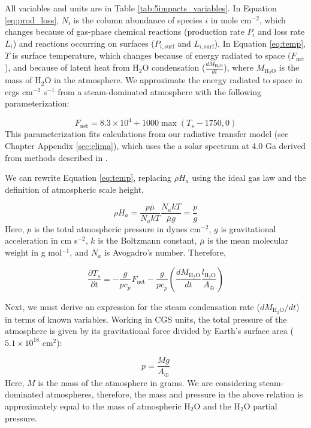 All variables and units are in Table \ref{tab:5impacts_variables}. In Equation \eqref{eq:prod_loss}, $N_i$ is the column abundance of species $i$ in mole cm$^{-2}$, which changes because of gas-phase chemical reactions (production rate $P_i$ and loss rate $L_i$) and reactions occurring on surfaces ($P_{i,\text{surf}}$ and $L_{i,\text{surf}}$). In Equation \eqref{eq:temp}, $T$ is surface temperature, which changes because of energy radiated to space ($F_\text{net}$), and because of latent heat from H$_2$O condensation ($\frac{d M_\mathrm{H_2O}}{dt}$), where $M_\mathrm{H_2O}$ is the mass of H$_2$O in the atmosphere. We approximate the energy radiated to space in ergs cm$^{-2}$ s$^{-1}$ from a steam-dominated atmosphere with the following parameterization:

\begin{equation}
  F_\text{net} = 8.3 \times 10^4 + 1000 \max(T_s - 1750,0)
\end{equation}
This parameterization fits calculations from our radiative transfer model (see Chapter Appendix \ref{sec:clima}), which uses the a solar spectrum at 4.0 Ga derived from methods described in \citet{Claire_2012}. 

We can rewrite Equation \eqref{eq:temp}, replacing $\rho H_a$ using the ideal gas law and the definition of atmospheric scale height,

\begin{equation}
  \rho H_a = \frac{p \bar\mu}{N_a k T} \frac{N_a k T}{\bar\mu g} = \frac{p}{g}
\end{equation}
Here, $p$ is the total atmospheric pressure in dynes cm$^{-2}$, $g$ is gravitational acceleration in cm s$^{-2}$, $k$ is the Boltzmann constant, $\bar\mu$ is the mean molecular weight in g mol$^{-1}$, and $N_a$ is Avogadro's number. Therefore,

\begin{equation} \label{eq:temp0}
  \frac{\partial T_s}{\partial t} = -\frac{g}{p c_p} F_\text{net} - \frac{g}{p c_p}\left(\frac{d M_\mathrm{H_2O}}{dt} \frac{l_\mathrm{H_2O}}{A_\oplus}\right) 
\end{equation}

Next, we must derive an expression for the steam condensation rate ($d M_\mathrm{H_2O}/dt$) in terms of known variables. Working in CGS units, the total pressure of the atmosphere is given by its gravitational force divided by Earth's surface area ($5.1 \times 10^{18}$ cm$^2$):

\begin{equation}
 p = \frac{Mg}{A_\oplus}
\end{equation}
Here, $M$ is the mass of the atmosphere in grams. We are considering steam-dominated atmospheres, therefore, the mass and pressure in the above relation is approximately equal to the mass of atmospheric H$_2$O and the H$_2$O partial pressure.

